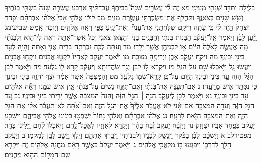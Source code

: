 \documentclass[twoside, openany, parskip=half, 11pt]{book}
\begin{document}
בַּלָּ֑יְלָה וַתִּדַּ֥ד שְׁנָתִ֖י מֵֽעֵינָֽי׃ מא זֶה־לִּ֞י עֶשְׂרִ֣ים שָׁנָה֮ בְּבֵיתֶ֒ךָ֒ עֲבַדְתִּ֜יךָ אַרְבַּֽע־עֶשְׂרֵ֤ה שָׁנָה֙ בִּשְׁתֵּ֣י בְנֹתֶ֔יךָ וְשֵׁ֥שׁ שָׁנִ֖ים בְּצֹאנֶ֑ךָ וַתַּחֲלֵ֥ף אֶת־מַשְׂכֻּרְתִּ֖י עֲשֶׂ֥רֶת מֹנִֽים׃ מב לוּלֵ֡י אֱלֹהֵ֣י אָבִי֩ אֱלֹהֵ֨י אַבְרָהָ֜ם וּפַ֤חַד יִצְחָק֙ הָ֣יָה לִ֔י כִּ֥י עַתָּ֖ה רֵיקָ֣ם שִׁלַּחְתָּ֑נִי אֶת־עׇנְיִ֞י וְאֶת־יְגִ֧יעַ כַּפַּ֛י רָאָ֥ה אֱלֹהִ֖ים וַיּ֥וֹכַח אָֽמֶשׁ׃ שביעימג וַיַּ֨עַן לָבָ֜ן וַיֹּ֣אמֶר אֶֽל־יַעֲקֹ֗ב הַבָּנ֨וֹת בְּנֹתַ֜י וְהַבָּנִ֤ים בָּנַי֙ וְהַצֹּ֣אן צֹאנִ֔י וְכֹ֛ל אֲשֶׁר־אַתָּ֥ה רֹאֶ֖ה לִי־ה֑וּא וְלִבְנֹתַ֞י מָֽה־אֶעֱשֶׂ֤ה לָאֵ֙לֶּה֙ הַיּ֔וֹם א֥וֹ לִבְנֵיהֶ֖ן אֲשֶׁ֥ר יָלָֽדוּ׃ מד וְעַתָּ֗ה לְכָ֛ה נִכְרְתָ֥ה בְרִ֖ית אֲנִ֣י וָאָ֑תָּה וְהָיָ֥ה לְעֵ֖ד בֵּינִ֥י וּבֵינֶֽךָ׃ מה וַיִּקַּ֥ח יַעֲקֹ֖ב אָ֑בֶן וַיְרִימֶ֖הָ מַצֵּבָֽה׃ מו וַיֹּ֨אמֶר יַעֲקֹ֤ב לְאֶחָיו֙ לִקְט֣וּ אֲבָנִ֔ים וַיִּקְח֥וּ אֲבָנִ֖ים וַיַּֽעֲשׂוּ־גָ֑ל וַיֹּ֥אכְלוּ שָׁ֖ם עַל־הַגָּֽל׃ מז וַיִּקְרָא־ל֣וֹ לָבָ֔ן יְגַ֖ר שָׂהֲדוּתָ֑א וְיַֽעֲקֹ֔ב קָ֥רָא ל֖וֹ גַּלְעֵֽד׃ מח וַיֹּ֣אמֶר לָבָ֔ן הַגַּ֨ל הַזֶּ֥ה עֵ֛ד בֵּינִ֥י וּבֵינְךָ֖ הַיּ֑וֹם עַל־כֵּ֥ן קָרָֽא־שְׁמ֖וֹ גַּלְעֵֽד׃ מט וְהַמִּצְפָּה֙ אֲשֶׁ֣ר אָמַ֔ר יִ֥צֶף יְהֹוָ֖ה בֵּינִ֣י וּבֵינֶ֑ךָ כִּ֥י נִסָּתֵ֖ר אִ֥ישׁ מֵרֵעֵֽהוּ׃ נ אִם־תְּעַנֶּ֣ה אֶת־בְּנֹתַ֗י וְאִם־תִּקַּ֤ח נָשִׁים֙ עַל־בְּנֹתַ֔י אֵ֥ין אִ֖ישׁ עִמָּ֑נוּ רְאֵ֕ה אֱלֹהִ֥ים עֵ֖ד בֵּינִ֥י וּבֵינֶֽךָ׃ נא וַיֹּ֥אמֶר לָבָ֖ן לְיַעֲקֹ֑ב הִנֵּ֣ה ׀ הַגַּ֣ל הַזֶּ֗ה וְהִנֵּה֙ הַמַּצֵּבָ֔ה אֲשֶׁ֥ר יָרִ֖יתִי בֵּינִ֥י וּבֵינֶֽךָ׃ נב עֵ֚ד הַגַּ֣ל הַזֶּ֔ה וְעֵדָ֖ה הַמַּצֵּבָ֑ה אִם־אָ֗נִי לֹֽא־אֶעֱבֹ֤ר אֵלֶ֙יךָ֙ אֶת־הַגַּ֣ל הַזֶּ֔ה וְאִם־אַ֠תָּ֠ה לֹא־תַעֲבֹ֨ר אֵלַ֜י אֶת־הַגַּ֥ל הַזֶּ֛ה וְאֶת־הַמַּצֵּבָ֥ה הַזֹּ֖את לְרָעָֽה׃ נג אֱלֹהֵ֨י אַבְרָהָ֜ם וֵֽאלֹהֵ֤י נָחוֹר֙ יִשְׁפְּט֣וּ בֵינֵ֔ינוּ אֱלֹהֵ֖י אֲבִיהֶ֑ם וַיִּשָּׁבַ֣ע יַעֲקֹ֔ב בְּפַ֖חַד אָבִ֥יו יִצְחָֽק׃ נד וַיִּזְבַּ֨ח יַעֲקֹ֥ב זֶ֙בַח֙ בָּהָ֔ר וַיִּקְרָ֥א לְאֶחָ֖יו לֶאֱכׇל־לָ֑חֶם וַיֹּ֣אכְלוּ לֶ֔חֶם וַיָּלִ֖ינוּ בָּהָֽר׃ מפטירלב א וַיַּשְׁכֵּ֨ם לָבָ֜ן בַּבֹּ֗קֶר וַיְנַשֵּׁ֧ק לְבָנָ֛יו וְלִבְנוֹתָ֖יו וַיְבָ֣רֶךְ אֶתְהֶ֑ם וַיֵּ֛לֶךְ וַיָּ֥שׇׁב לָבָ֖ן לִמְקֹמֽוֹ׃ ב וְיַעֲקֹ֖ב הָלַ֣ךְ לְדַרְכּ֑וֹ וַיִּפְגְּעוּ־ב֖וֹ מַלְאֲכֵ֥י אֱלֹהִֽים׃ ג וַיֹּ֤אמֶר יַעֲקֹב֙ כַּאֲשֶׁ֣ר רָאָ֔ם מַחֲנֵ֥ה אֱלֹהִ֖ים זֶ֑ה וַיִּקְרָ֛א שֵֽׁם־הַמָּק֥וֹם הַה֖וּא מַֽחֲנָֽיִם׃
\end{document}
